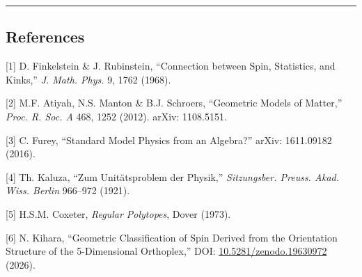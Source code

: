\documentclass[a4paper,11pt]{article}
\begin{document}
\begin{center}\rule{0.5\linewidth}{0.5pt}\end{center}

\subsection*{References}

{[}1{]} D. Finkelstein \& J. Rubinstein, ``Connection between Spin, Statistics, and Kinks,'' \emph{J. Math. Phys.} 9, 1762 (1968).

{[}2{]} M.F. Atiyah, N.S. Manton \& B.J. Schroers, ``Geometric Models of Matter,'' \emph{Proc. R. Soc. A} 468, 1252 (2012). arXiv: 1108.5151.

{[}3{]} C. Furey, ``Standard Model Physics from an Algebra?'' arXiv: 1611.09182 (2016).

{[}4{]} Th. Kaluza, ``Zum Unit\"atsproblem der Physik,'' \emph{Sitzungsber. Preuss. Akad. Wiss. Berlin} 966--972 (1921).

{[}5{]} H.S.M. Coxeter, \emph{Regular Polytopes}, Dover (1973).

{[}6{]} N. Kihara, ``Geometric Classification of Spin Derived from the Orientation Structure of the 5-Dimensional Orthoplex,'' DOI: \href{https://doi.org/10.5281/zenodo.19630972}{10.5281/zenodo.19630972} (2026).
\end{document}
